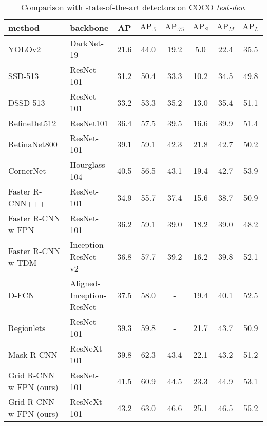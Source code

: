 \documentclass[10pt,twocolumn,letterpaper]{article}
\begin{document}
\begin{table*}[t]
\begin{center}
\begin{tabular}{ l | l | c | c  c | c  c  c }
\hline
method & backbone & AP & $\text{AP}_{.5}$ & $\text{AP}_{.75}$ & $\text{AP}_{S}$ & $\text{AP}_{M}$ & $\text{AP}_{L}$ \\
\hline
YOLOv2~\cite{redmon2016yolo9000} & DarkNet-19  & 21.6 & 44.0 & 19.2 & 5.0 & 22.4 & 35.5 \\
SSD-513~\cite{DBLP:journals/corr/LiuAESR15} & ResNet-101  & 31.2 & 50.4 & 33.3 & 10.2 & 34.5 & 49.8 \\
DSSD-513~\cite{fu2017dssd} & ResNet-101  & 33.2 & 53.3 & 35.2 & 13.0 & 35.4 & 51.1 \\
RefineDet512~\cite{zhang2017single} & ResNet101  & 36.4 & 57.5 & 39.5 & 16.6 & 39.9 & 51.4 \\
RetinaNet800~\cite{lin2018focal} & ResNet-101  & 39.1 & 59.1 & 42.3 & 21.8 & 42.7 & 50.2 \\
CornerNet & Hourglass-104  & 40.5 & 56.5 & 43.1 & 19.4 & 42.7 & 53.9 \\
\hline
Faster R-CNN+++~\cite{he2016deep} & ResNet-101  & 34.9 & 55.7 & 37.4 & 15.6 & 38.7 & 50.9 \\
Faster R-CNN w FPN~\cite{lin2017feature} & ResNet-101  & 36.2 & 59.1 & 39.0 & 18.2 & 39.0 & 48.2 \\
Faster R-CNN w TDM~\cite{shrivastava2016beyond} & Inception-ResNet-v2~\cite{szegedy2017inception}  & 36.8 & 57.7 & 39.2 & 16.2 & 39.8 & 52.1 \\
D-FCN~\cite{dai2017deformable} & Aligned-Inception-ResNet & 37.5 & 58.0 & - & 19.4 & 40.1 & 52.5 \\
Regionlets~\cite{xu2017deep} & ResNet-101 & 39.3 & 59.8 & - & 21.7 & 43.7 & 50.9 \\
Mask R-CNN~\cite{he2017mask}  & ResNeXt-101 & 39.8 & 62.3 & 43.4 & 22.1 & 43.2 & 51.2 \\
Grid R-CNN w FPN (ours) & ResNet-101 & 41.5 & 60.9 & 44.5 & 23.3 & 44.9 & 53.1 \\
Grid R-CNN w FPN (ours) & ResNeXt-101  & 43.2 & 63.0 & 46.6 & 25.1 & 46.5 & 55.2 \\
\end{tabular}
\vspace{1mm}
\caption{Comparison with state-of-the-art detectors on COCO \textit{test-dev}.}
\label{tab:test}
\end{center}
\end{table*}
\end{document}

